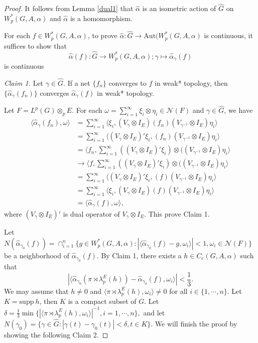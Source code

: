 \documentclass[reqno,11pt]{amsart}
\theoremstyle{plain}
\theoremstyle{definition}
\theoremstyle{remark}
\newcommand{\la}{\langle}
\newcommand{\ra}{\rangle}
\begin{document}
\begin{proof}
It follows from Lemma \ref{dual1} that $\hat{\alpha}$ is an isometric action of $\hat{G}$ on $W^*_p(G,A,\alpha)$ and $\hat{\alpha}$ is a homomorphism.

For each $f\in W^*_p(G,A,\alpha)$,
to prove $\hat{\alpha}:\hat{G}\rightarrow \mathrm{Aut}(W^*_p(G,A,\alpha)$ is continuous, it suffices to show that $$\hat{\alpha}(f):\hat{G}\rightarrow W^*_p(G,A,\alpha); \gamma\mapsto\hat{\alpha}_\gamma(f)$$ is continuous


{\it Claim 1.} Let $\gamma\in \hat{G}$. If a net $\{f_n\}$ converges to $f$ in weak* topology, then $\{\hat{\alpha}_\gamma(f_n)\}$ converges $\hat{\alpha}_\gamma(f)$ in weak* topology.

 Let $F=L^p(G)\otimes_p E$. For each $\omega=\sum_{i=1}^\infty\xi_i\otimes\eta_i\in \mathcal{N}(F)$ and $\gamma\in\hat{G}$,  we have
$$\begin{aligned} \la \hat{\alpha}_\gamma(f_n),\omega\ra &=
\sum_{i=1}^\infty\la\xi_i,(V_\gamma\otimes I_E)(f_n)( V_{\gamma^{-1}}\otimes I_E)\eta_i\ra
  \\ &=\sum_{i=1}^\infty\la (V_\gamma\otimes I_E)'\xi_i,(f_n)(V_{\gamma^{-1}}\otimes I_E)\eta_i\ra
  \\ &=\la f_n,\sum_{i=1}^\infty ((V_\gamma\otimes I_E)'\xi_i)\otimes ((V_{\gamma^{-1}}\otimes I_E)\eta_i\ra
   \\ &\rightarrow \la f,\sum_{i=1}^\infty ((V_\gamma\otimes I_E)'\xi_i)\otimes ((V_{\gamma^{-1}}\otimes I_E)\eta_i\ra
   \\&=\sum_{i=1}^\infty\la (V_\gamma\otimes I_E)'\xi_i,(f)(V_{\gamma^{-1}}\otimes I_E)\eta_i\ra
   \\&=\sum_{i=1}^\infty\la\xi_i,(V_\gamma\otimes I_E)(f)(V_{\gamma^{-1}}\otimes I_E)\eta_i\ra
   \\&=\la \hat{\alpha}_\gamma(f),\omega\ra,\end{aligned}$$
where $(V_\gamma\otimes I_E)'$ is dual operator of $V_\gamma\otimes I_E$.
This prove Claim 1.

Let $N(\hat{\alpha}_{\gamma_0}(f))=\cap_{i=1}^n\{g\in W^*_p(G,A,\alpha):|\la \hat{\alpha}_{\gamma_0}(f)-g,\omega_i\ra|<1,\omega_i\in \mathcal{N}(F)\}$
be a neighborhood of $\hat{\alpha}_{\gamma_0}(f)$.
By Claim 1, there exists a $h\in C_c(G,A,\alpha)$ such that $$|\la \hat{\alpha}_{\gamma_0}(\pi\rtimes \lambda_p^E(h))-\hat{\alpha}_{\gamma_0}(f),\omega_i\ra|<\frac{1}{3}.$$ We may assume that $h\neq 0$ and $\la\pi\rtimes \lambda_p^E(h),\omega_i\ra\neq 0$ for all $i\in\{1,\cdots,n\}$. Let $K=\mathrm{supp} ~h$, then $K$ is a compact subset of $G$.
Let $\delta=\frac{1}{3}\min\{|\la\pi\rtimes \lambda_p^E(h),\omega_i\ra|^{-1},i=1,\cdots,n\},$ and let $N(\gamma_0)=\{\gamma\in \hat{G}:|\gamma(t)-\gamma_0(t)|<\delta,t\in K\}$. We will finish the proof by showing the following Claim 2.


\end{proof}
\end{document}
